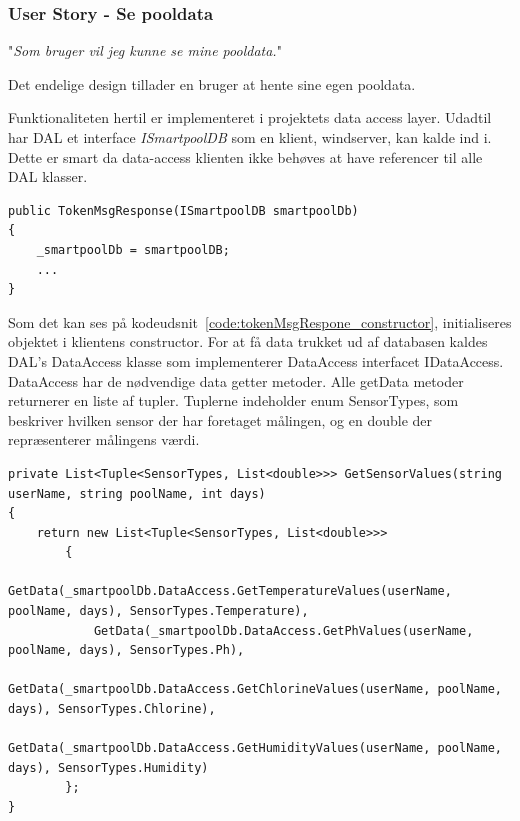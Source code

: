 \subsubsection{User Story - Se pooldata}

"\textit{Som bruger vil jeg kunne se mine pooldata.}"

Det endelige design tillader en bruger at hente sine egen pooldata.

Funktionaliteten hertil er implementeret i projektets data access layer. Udadtil har DAL et interface \textit{ISmartpoolDB} som en klient, \gls{windserver}, kan kalde ind i. Dette er smart da data-access klienten ikke behøves at have referencer til alle DAL klasser.

\begin{lstlisting}[caption=TokenMsgResponse constructor,label=code:tokenMsgRespone_constructor]
public TokenMsgResponse(ISmartpoolDB smartpoolDb)
{
	_smartpoolDb = smartpoolDB;
	...
}
\end{lstlisting}

Som det kan ses på kodeudsnit~\ref{code:tokenMsgRespone_constructor}, initialiseres objektet i klientens constructor.
For at få data trukket ud af databasen kaldes DAL's DataAccess klasse som implementerer DataAccess interfacet IDataAccess. DataAccess har de nødvendige data getter metoder. 
Alle getData metoder returnerer en liste af tupler. Tuplerne indeholder enum SensorTypes, som beskriver hvilken sensor der har foretaget målingen, og en double der repræsenterer målingens værdi.

\begin{lstlisting}[caption=something, label=code:derp]
private List<Tuple<SensorTypes, List<double>>> GetSensorValues(string userName, string poolName, int days)
{
	return new List<Tuple<SensorTypes, List<double>>>
		{
			GetData(_smartpoolDb.DataAccess.GetTemperatureValues(userName, poolName, days), SensorTypes.Temperature),
			GetData(_smartpoolDb.DataAccess.GetPhValues(userName, poolName, days), SensorTypes.Ph),
			GetData(_smartpoolDb.DataAccess.GetChlorineValues(userName, poolName, days), SensorTypes.Chlorine),
			GetData(_smartpoolDb.DataAccess.GetHumidityValues(userName, poolName, days), SensorTypes.Humidity)
		};
}
\end{lstlisting}

